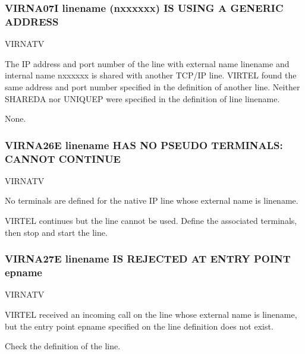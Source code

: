 \documentclass[letterpaper,10pt,english]{sphinxmanual}
\begin{document}
\subsubsection{VIRNA07I linename (n\sphinxhyphen{}xxxxxx) IS USING A GENERIC ADDRESS}
\label{\detokenize{messages:virna07i-linename-n-xxxxxx-is-using-a-generic-address}}\begin{description}
\sphinxAtStartPar
VIRNATV

\sphinxAtStartPar
The IP address and port number of the line with external name linename and internal name n\sphinxhyphen{}xxxxxx is shared with another TCP/IP line. VIRTEL found the same address and port number specified in the definition of another line. Neither SHAREDA nor UNIQUEP were specified in the definition of line linename.

\sphinxAtStartPar
None.

\end{description}


\subsubsection{VIRNA26E linename HAS NO PSEUDO TERMINALS: CANNOT CONTINUE}
\label{\detokenize{messages:virna26e-linename-has-no-pseudo-terminals-cannot-continue}}\begin{description}
\sphinxAtStartPar
VIRNATV

\sphinxAtStartPar
No terminals are defined for the native IP line whose external name is linename.

\sphinxAtStartPar
VIRTEL continues but the line cannot be used. Define the associated terminals, then stop and start the line.

\end{description}


\subsubsection{VIRNA27E linename IS REJECTED AT ENTRY POINT epname}
\label{\detokenize{messages:virna27e-linename-is-rejected-at-entry-point-epname}}\begin{description}
\sphinxAtStartPar
VIRNATV

\sphinxAtStartPar
VIRTEL received an incoming call on the line whose external name is linename, but the entry point epname specified on the line definition does not exist.

\sphinxAtStartPar
Check the definition of the line.

\end{description}
\end{document}
